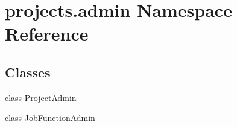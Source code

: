 \hypertarget{namespaceprojects_1_1admin}{\section{projects.\-admin Namespace Reference}
\label{namespaceprojects_1_1admin}
}
\subsection*{Classes}
\begin{DoxyCompactItemize}
\item 
class \hyperlink{classprojects_1_1admin_1_1_project_admin}{Project\-Admin}
\item 
class \hyperlink{classprojects_1_1admin_1_1_job_function_admin}{Job\-Function\-Admin}
\end{DoxyCompactItemize}
